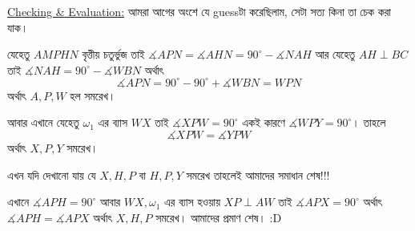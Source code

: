 \documentclass[a4paper,11pt]{article}
\newcommand{\drg}{^{\circ}}
\begin{document}
\underline{Checking \& Evaluation:} 
আমরা আগের অংশে যে guessটা করেছিলাম, সেটা সত্য কিনা তা চেক করা যাক। 

যেহেতু $AMPHN$ বৃত্তীয় চতুর্ভুজ তাই $\measuredangle APN=\measuredangle AHN=90\drg-\measuredangle NAH$ আর যেহেতু $AH \perp BC$ তাই $\measuredangle NAH =90\drg-\measuredangle WBN$ অর্থাৎ 
\[\measuredangle APN=90\drg-90\drg+\measuredangle WBN=WPN\]
অর্থাৎ $A,P,W$ হল সমরেখ। 

আবার এখানে যেহেতু $\omega_1$ এর ব্যাস $WX$ তাই $\measuredangle XPW=90\drg$ একই কারণে $\measuredangle WPY=90\drg$। তাহলে 
\[\measuredangle XPW=\measuredangle YPW \]
অর্থাৎ $X,P,Y$ সমরেখ। 

এখন যদি দেখানো যায় যে $X,H,P$ বা $H,P,Y$ সমরেখ তাহলেই আমাদের সমাধান শেষ!!! 

এখানে $\measuredangle APH=90\drg$ আবার $WX, \omega_1$ এর ব্যাস হওয়ায়  $XP \perp AW$ তাই $\measuredangle APX=90\drg$  অর্থাৎ $\measuredangle APH=\measuredangle APX$ অর্থাৎ $X,H,P$ সমরেখ। আমাদের প্রমাণ শেষ। :D 
\end{document}
